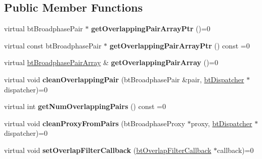 \subsection*{Public Member Functions}
\begin{DoxyCompactItemize}
\item 
\mbox{\label{classbtOverlappingPairCache_a86f4b7575c0af1b378de5bd31fdaa0a2}} 
virtual bt\+Broadphase\+Pair $\ast$ {\bfseries get\+Overlapping\+Pair\+Array\+Ptr} ()=0
\item 
\mbox{\label{classbtOverlappingPairCache_a87c26afd7caa9a824ed3729465bde1c2}} 
virtual const bt\+Broadphase\+Pair $\ast$ {\bfseries get\+Overlapping\+Pair\+Array\+Ptr} () const =0
\item 
\mbox{\label{classbtOverlappingPairCache_af1df94277b6d316b63dc0f52ac672c69}} 
virtual \hyperlink{classbtAlignedObjectArray}{bt\+Broadphase\+Pair\+Array} \& {\bfseries get\+Overlapping\+Pair\+Array} ()=0
\item 
\mbox{\label{classbtOverlappingPairCache_ab0f4a8fc8c59108b5009d0a8b1f59cf5}} 
virtual void {\bfseries clean\+Overlapping\+Pair} (bt\+Broadphase\+Pair \&pair, \hyperlink{classbtDispatcher}{bt\+Dispatcher} $\ast$dispatcher)=0
\item 
\mbox{\label{classbtOverlappingPairCache_a1891ba8fa73578f6d07aa9a67abcdb96}} 
virtual int {\bfseries get\+Num\+Overlapping\+Pairs} () const =0
\item 
\mbox{\label{classbtOverlappingPairCache_a31a0b857f0eb4e2484be6dcc468a6d36}} 
virtual void {\bfseries clean\+Proxy\+From\+Pairs} (bt\+Broadphase\+Proxy $\ast$proxy, \hyperlink{classbtDispatcher}{bt\+Dispatcher} $\ast$dispatcher)=0
\item 
\mbox{\label{classbtOverlappingPairCache_a397db584fa4dbec851447d3911507509}} 
virtual void {\bfseries set\+Overlap\+Filter\+Callback} (\hyperlink{structbtOverlapFilterCallback}{bt\+Overlap\+Filter\+Callback} $\ast$callback)=0
\item 
\mbox{\label{classbtOverlappingPairCache_a64d66749a8f8f1bd3bc877d4ac1371f3}} 

\end{DoxyCompactItemize}
